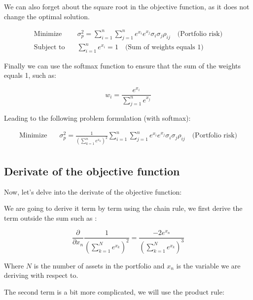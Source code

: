 \documentclass[12pt]{article}
\begin{document}
We can also forget about the square root in the objective function, as it does not change the optimal solution.

\begin{equation}
    \begin{aligned}
        \text{Minimize} \quad   & \sigma_p^2 = \sum_{i=1}^{n}\sum_{j=1}^{n} e^{x_i} e^{x_j}\sigma_i \sigma_j \rho_{ij} \quad \text{(Portfolio risk)} \\
        \text{Subject to} \quad & \sum_{i=1}^{n} e^{x_i} = 1 \quad \text{(Sum of weights equals 1)}    
    \end{aligned}
\end{equation}


Finally we can use the softmax function to ensure that the sum of the weights equals 1, such as:

\begin{equation}
    w_i = \frac{e^{x_i}}{\sum_{j=1}^{n} e^{x_j}}
\end{equation}

Leading to the following problem formulation (with softmax):

\begin{equation}
    \begin{aligned}
        \text{Minimize} \quad   & \sigma_p^2 = \frac{1}{(\sum_{k=1}^{n} e^{x_k})^{2}} \sum_{i=1}^{n}\sum_{j=1}^{n} e^{x_i} e^{x_j}\sigma_i \sigma_j \rho_{ij} \quad \text{(Portfolio risk)} \\
    \end{aligned}
\end{equation}

\subsection*{Derivate of the objective function}

Now, let's delve into the derivate of the objective function:

We are going to derive it term by term using the chain rule, we first derive the term outside the sum such as :

\begin{equation}
    \frac{\partial}{\partial x_n} \frac{1}{(\sum_{k=1}^{N} e^{x_k})^{2}} = \frac{-2 e^{x_n}}{(\sum_{k=1}^{N} e^{x_k})^{3}}
\end{equation}

Where $N$ is the number of assets in the portfolio and $x_n$ is the variable we are deriving with respect to.

The second term is a bit more complicated, we will use the product rule:
\end{document}
